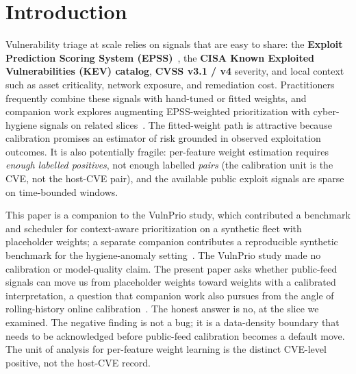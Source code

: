 \section{Introduction}
Vulnerability triage at scale relies on signals that are easy to share: the \textbf{Exploit Prediction Scoring System (EPSS)}~\cite{Jacobs2021EPSS,Jacobs2023EnhancingEPSS}, the \textbf{CISA Known Exploited Vulnerabilities (KEV) catalog}, \textbf{CVSS v3.1 / v4} severity, and local context such as asset criticality, network exposure, and remediation cost. Practitioners frequently combine these signals with hand-tuned or fitted weights, and companion work explores augmenting EPSS-weighted prioritization with cyber-hygiene signals on related slices~\cite{paper4hygieneprio}. The fitted-weight path is attractive because calibration promises an estimator of risk grounded in observed exploitation outcomes. It is also potentially fragile: per-feature weight estimation requires \emph{enough labelled positives}, not enough labelled \emph{pairs} (the calibration unit is the CVE, not the host-CVE pair), and the available public exploit signals are sparse on time-bounded windows.

This paper is a companion to the VulnPrio study, which contributed a benchmark and scheduler for context-aware prioritization on a synthetic fleet with placeholder weights; a separate companion contributes a reproducible synthetic benchmark for the hygiene-anomaly setting~\cite{paper3hygienebench}. The VulnPrio study made no calibration or model-quality claim. The present paper asks whether public-feed signals can move us from placeholder weights toward weights with a calibrated interpretation, a question that companion work also pursues from the angle of rolling-history online calibration~\cite{paper7online}. The honest answer is no, at the slice we examined. The negative finding is not a bug; it is a data-density boundary that needs to be acknowledged before public-feed calibration becomes a default move. The unit of analysis for per-feature weight learning is the distinct CVE-level positive, not the host-CVE record.

